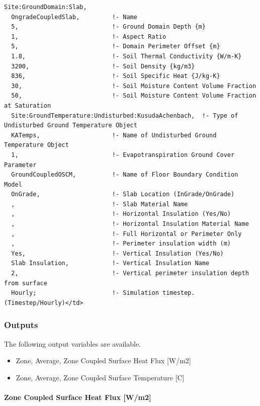 \begin{lstlisting}
Site:GroundDomain:Slab,
  OngradeCoupledSlab,         !- Name
  5,                          !- Ground Domain Depth {m}
  1,                          !- Aspect Ratio
  5,                          !- Domain Perimeter Offset {m}
  1.8,                        !- Soil Thermal Conductivity {W/m-K}
  3200,                       !- Soil Density {kg/m3}
  836,                        !- Soil Specific Heat {J/kg-K}
  30,                         !- Soil Moisture Content Volume Fraction
  50,                         !- Soil Moisture Content Volume Fraction at Saturation
  Site:GroundTemperature:Undisturbed:KusudaAchenbach,  !- Type of Undisturbed Ground Temperature Object
  KATemps,                    !- Name of Undisturbed Ground Temperature Object
  1,                          !- Evapotranspiration Ground Cover Parameter
  GroundCoupledOSCM,          !- Name of Floor Boundary Condition Model
  OnGrade,                    !- Slab Location (InGrade/OnGrade)
  ,                           !- Slab Material Name
  ,                           !- Horizontal Insulation (Yes/No)
  ,                           !- Horizontal Insulation Material Name
  ,                           !- Full Horizontal or Perimeter Only
  ,                           !- Perimeter insulation width (m)
  Yes,                        !- Vertical Insulation (Yes/No)
  Slab Insulation,            !- Vertical Insulation Name
  2,                          !- Vertical perimeter insulation depth from surface
  Hourly;                     !- Simulation timestep. (Timestep/Hourly)</td>
\end{lstlisting}

\subsubsection{Outputs}\label{outputs-1-015}

The following output variables are available.

\begin{itemize}
\tightlist
\item
  Zone, Average, Zone Coupled Surface Heat Flux {[}W/m2{]}
\item
  Zone, Average, Zone Coupled Surface Temperature {[}C{]}
\end{itemize}

\paragraph{Zone Coupled Surface Heat Flux {[}W/m2{]}}\label{zone-coupled-surface-heat-flux-wm2}

